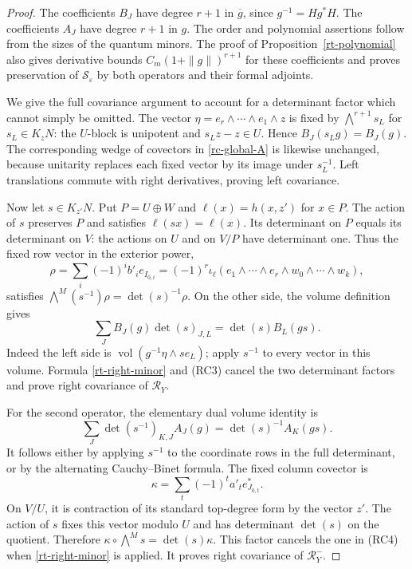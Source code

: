 \begin{proof}
The coefficients $B_J$ have degree $r+1$
in $\overline g$, since $g^{-1}=Hg^*H$.
The coefficients $A_J$ have degree $r+1$
in $g$.  The order and polynomial assertions
follow from the sizes of the quantum minors.
The proof of Proposition~\ref{rt-polynomial}
also gives derivative bounds
$C_m(1+\|g\|)^{r+1}$ for these coefficients
and proves preservation of
$\mathscr S_\varepsilon$ by both operators
and their formal adjoints.

We give the full covariance argument to account
for a determinant factor which cannot simply
be omitted.
The vector
$\eta=e_r\wedge\cdots\wedge e_1\wedge z$
is fixed by $\bigwedge^{r+1}s_L$ for
$s_L\in K_zN$: the $U$-block is unipotent
and $s_Lz-z\in U$.
Hence $B_J(s_Lg)=B_J(g)$.
The corresponding wedge of covectors in
\eqref{rc-global-A} is likewise unchanged,
because unitarity replaces each fixed vector
by its image under $s_L^{-1}$.
Left translations commute with right
derivatives, proving left covariance.

Now let $s\in K_{z'}N$.
Put $P=U\oplus W$ and
$\ell(x)=h(x,z')$ for $x\in P$.
The action of $s$ preserves $P$ and satisfies
$\ell(sx)=\ell(x)$.
Its determinant on $P$ equals its determinant
on $V$: the actions on $U$ and on
$V/P$ have determinant one.
Thus the fixed row vector in the exterior
power,
\[
       \rho=\sum_i(-1)^i b'_i e_{I_{0,i}}
          =(-1)^r\iota_\ell
                  (e_1\wedge\cdots\wedge e_r
                         \wedge w_0\wedge\cdots\wedge w_k),
\]
satisfies
$\bigwedge^M(s^{-1})\rho=\det(s)^{-1}\rho$.
On the other side, the volume definition gives
\[
 \sum_J B_J(g)\det(s)_{J,L}
                  =\det(s) B_L(gs).
                                                     \tag{RC3}
\]
Indeed the left side is
$\operatorname{vol}(g^{-1}\eta\wedge s e_L)$;
apply $s^{-1}$ to every vector in this
volume.  Formula \eqref{rt-right-minor}
and (RC3) cancel the two determinant
factors and prove right covariance of
$\mathcal R_Y$.

For the second operator, the elementary
dual volume identity is
\[
 \sum_J\det(s^{-1})_{K,J}A_J(g)
                      =\det(s)^{-1}A_K(gs).
                                                     \tag{RC4}
\]
It follows either by applying $s^{-1}$ to
the coordinate rows in the full determinant,
or by the alternating Cauchy--Binet formula.
The fixed column covector is
\[
                  \kappa=\sum_t(-1)^t a'_t e_{J_{0,t}}^*.
 \]
On $V/U$, it is contraction of its standard
top-degree form by the vector $z'$.
The action of $s$ fixes this vector modulo
$U$ and has determinant $\det(s)$ on the
quotient.  Therefore
$\kappa\circ\bigwedge^M s=\det(s)\kappa$.
This factor cancels the one in (RC4) when
\eqref{rt-right-minor} is applied.
It proves right covariance of
$\mathcal R_Y^-$.


\end{proof}
